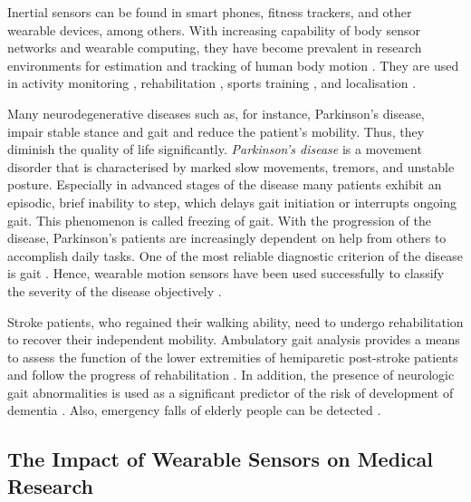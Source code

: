 Inertial sensors can be found in smart phones, fitness trackers, and other wearable devices, among others. With increasing capability of body sensor networks and wearable computing, they have become prevalent in research environments for estimation and tracking of human body motion \cite{bennett_motion_2014}. They are used in activity monitoring \cite{veltink_detection_96, najafi_ambulatory_03, ermes_sports_08}, rehabilitation \cite{giggins_rehabilitation_13, lupinski_ligament_11}, sports training \cite{bonnet_squat_13, ermes_sports_08}, and localisation \cite{hoflinger_localization_13, Bennett_distance_13}.

Many neurodegenerative diseases such as, for instance, Parkinson's disease, impair stable stance and gait and reduce the patient's mobility. Thus, they diminish the quality of life significantly. \emph{Parkinson's disease} is a movement disorder that is characterised by marked slow movements, tremors, and unstable posture. Especially in advanced stages of the disease many patients exhibit an episodic, brief inability to step, which delays gait initiation or interrupts ongoing gait. This phenomenon is called freezing of gait. With the progression of the disease, Parkinson's patients are increasingly dependent on help from others to accomplish daily tasks. One of the most reliable diagnostic criterion of the disease is gait \cite{tao_gait_2012}. Hence, wearable motion sensors have been used successfully to classify the severity of the disease objectively \cite{mancini_anticipatory_2009, palmerini_feature_2011, klerk_long-term_2009}.

Stroke patients, who regained their walking ability, need to undergo rehabilitation to recover their independent mobility. Ambulatory gait analysis provides a means to assess the function of the lower extremities of hemiparetic post-stroke patients and follow the progress of rehabilitation \cite{tao_gait_2012, saremi_reliability_2006}. In addition, the presence of neurologic gait abnormalities is used as a significant predictor of the risk of development of dementia \cite{verghese_dementia_2002}. Also, emergency falls of elderly people can be detected \cite{bourke_threshold-based_2008, bourke_assessment-waist_2010, bourke_fall_detection_2008}.

\subsection{The Impact of Wearable Sensors on Medical Research}

